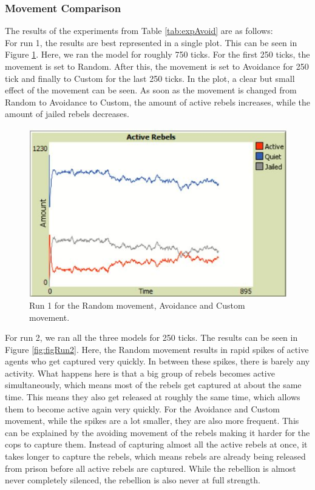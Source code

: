\documentclass[a4paper,11pt]{article}
\begin{document}
\subsubsection{Movement Comparison}
The results of the experiments from Table \ref{tab:expAvoid} are as follows:\\
For run 1, the results are best represented in a single plot. This can be seen in Figure \ref{fig:avoidanceRun1}. Here, we ran the model for roughly 750 ticks. For the first 250 ticks, the movement is set to Random. After this, the movement is set to Avoidance for 250 tick and finally to Custom for the last 250 ticks. In the plot, a clear but small effect of the movement can be seen. As soon as the movement is changed from Random to Avoidance to Custom, the amount of active rebels increases, while the amount of jailed rebels decreases.\\
\begin{figure}[h]
    \centering
    \includegraphics{Run1_Movement.jpg}
    \caption{Run 1 for the Random movement, Avoidance and Custom movement.}
    \label{fig:avoidanceRun1}
\end{figure}
For run 2, we ran all the three models for 250 ticks. The results can be seen in Figure \ref{fig:figRun2}. Here, the Random movement results in rapid spikes of active agents who get captured very quickly. In between these spikes, there is barely any activity. What happens here is that a big group of rebels becomes active simultaneously, which means most of the rebels get captured at about the same time. This means they also get released at roughly the same time, which allows them to become active again very quickly. For the Avoidance and Custom movement, while the spikes are a lot smaller, they are also more frequent. This can be explained by the avoiding movement of the rebels making it harder for the cops to capture them. Instead of capturing almost all the active rebels at once, it takes longer to capture the rebels, which means rebels are already being released from prison before all active rebels are captured. While the rebellion is almost never completely silenced, the rebellion is also never at full strength.\\
\end{document}
